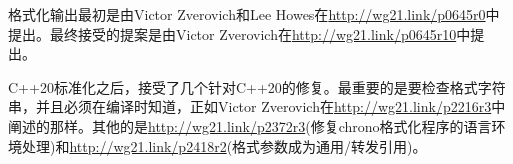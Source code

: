 格式化输出最初是由Victor Zverovich和Lee Howes在\url{http://wg21.link/p0645r0}中提出。最终接受的提案是由Victor Zverovich在\url{http://wg21.link/p0645r10}中提出。

C++20标准化之后，接受了几个针对C++20的修复。最重要的是要检查格式字符串，并且必须在编译时知道，正如Victor Zverovich在\url{http://wg21.link/p2216r3}中阐述的那样。其他的是\url{http://wg21.link/p2372r3}(修复chrono格式化程序的语言环境处理)和\url{http://wg21.link/p2418r2}(格式参数成为通用/转发引用)。